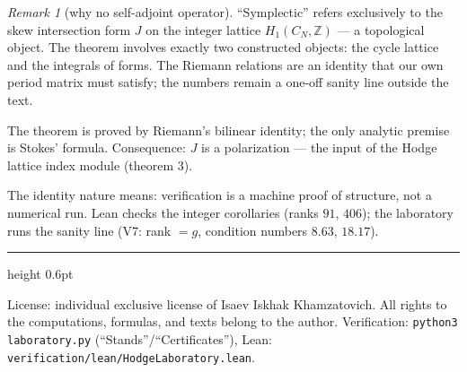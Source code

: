 \documentclass[11pt,a4paper]{article}
\theoremstyle{plain}
\theoremstyle{definition}
\theoremstyle{remark}
\newtheorem{remark}[theorem]{Remark}
\newcommand{\ZZ}{\mathbb{Z}}
\begin{document}
\begin{remark}[why no self-adjoint operator]
``Symplectic'' refers exclusively to the skew intersection form $J$
on the integer lattice $H_1(C_N,\ZZ)$ --- a topological object. The
theorem involves exactly two constructed objects: the cycle lattice
and the integrals of forms. The Riemann relations are an identity
that our own period matrix must satisfy; the numbers remain a
one-off sanity line outside the text.
\end{remark}

\begin{statusbox}[summary]
The theorem is proved by Riemann's bilinear identity; the only
analytic premise is Stokes' formula. Consequence: $J$ is a
polarization --- the input of the Hodge lattice index module
(theorem 3).
\end{statusbox}

\begin{verifybox}[reproduction]
The identity nature means: verification is a machine proof of
structure, not a numerical run. Lean checks the integer corollaries
(ranks $91$, $406$); the laboratory runs the sanity line (V7: rank
$=g$, condition numbers $8.63$, $18.17$).
\end{verifybox}

\vfill
{\color{linkblue}\hrule height 0.6pt}
\vspace{0.5em}
{\small\color{gray}
License: individual exclusive license of Isaev Iskhak Khamzatovich.
All rights to the computations, formulas, and texts belong to the author.
Verification: \texttt{python3 laboratory.py} (``Stands''/``Certificates''),
Lean: \texttt{verification/lean/HodgeLaboratory.lean}.
}
\end{document}
